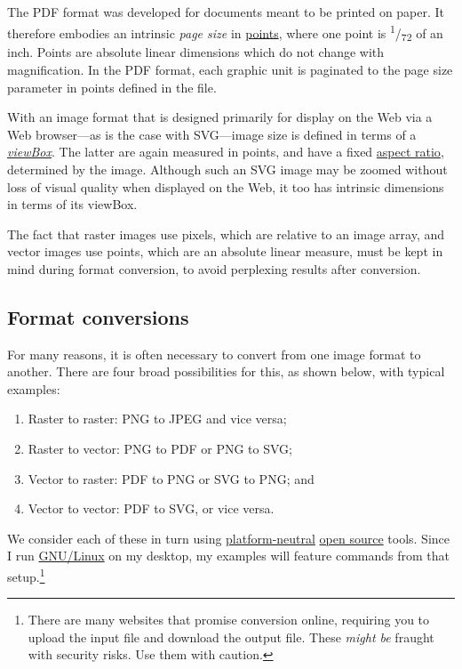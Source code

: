 \documentclass[
  11pt,
  british,
  a4paper,
]{article}
\providecommand{\tightlist}{%
  \setlength{\itemsep}{0pt}\setlength{\parskip}{0pt}}
\begin{document}
The PDF format was developed for documents meant to be printed on paper.
It therefore embodies an intrinsic \emph{page size} in
\href{https://en.wikipedia.org/wiki/Point_(typography)}{points}, where
one point is \textsuperscript{1}/\textsubscript{72} of an inch. Points
are absolute linear dimensions which do not change with magnification.
In the PDF format, each graphic unit is paginated to the page size
parameter in points defined in the file.

With an image format that is designed primarily for display on the Web
via a Web browser---as is the case with SVG---image size is defined in
terms of a
\href{https://developer.mozilla.org/en-US/docs/Web/SVG/Attribute/viewBox}{\emph{viewBox}}.
The latter are again measured in points, and have a fixed
\href{https://en.wikipedia.org/wiki/Aspect_ratio}{aspect ratio},
determined by the image. Although such an SVG image may be zoomed
without loss of visual quality when displayed on the Web, it too has
intrinsic dimensions in terms of its viewBox.

The fact that raster images use pixels, which are relative to an image
array, and vector images use points, which are an absolute linear
measure, must be kept in mind during format conversion, to avoid
perplexing results after conversion.

\hypertarget{format-conversions}{%
\subsection{Format conversions}\label{format-conversions}}

For many reasons, it is often necessary to convert from one image format
to another. There are four broad possibilities for this, as shown below,
with typical examples:

\begin{enumerate}
\tightlist
\item
  Raster to raster: PNG to JPEG and vice versa;
\item
  Raster to vector: PNG to PDF or PNG to SVG;
\item
  Vector to raster: PDF to PNG or SVG to PNG; and
\item
  Vector to vector: PDF to SVG, or vice versa.
\end{enumerate}

We consider each of these in turn using
\href{https://itlaw.wikia.org/wiki/Platform_neutral}{platform-neutral}
\href{https://opensource.com/resources/what-open-source}{open source}
tools. Since I run
\href{https://en.wikipedia.org/wiki/GNU/Linux_naming_controversy}{GNU/Linux}
on my desktop, my examples will feature commands from that
setup.\footnote{There are many websites that promise conversion online,
  requiring you to upload the input file and download the output file.
  These \emph{might be} fraught with security risks. Use them with
  caution.}
\end{document}
